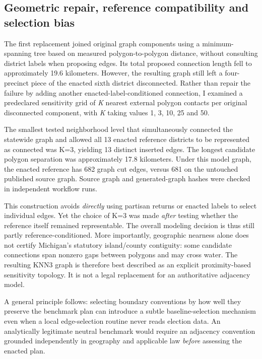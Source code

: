 \documentclass[
  10pt,
]{article}
\begin{document}
\hypertarget{geometric-repair-reference-compatibility-and-selection-bias}{%
\subsection{Geometric repair, reference compatibility and selection
bias}\label{geometric-repair-reference-compatibility-and-selection-bias}}

The first replacement joined original graph components using a
minimum-spanning tree based on measured polygon-to-polygon distance,
without consulting district labels when proposing edges. Its total
proposed connection length fell to approximately 19.6 kilometers.
However, the resulting graph still left a four-precinct piece of the
enacted sixth district disconnected. Rather than repair the failure by
adding another enacted-label-conditioned connection, I examined a
predeclared sensitivity grid of \emph{K} nearest external polygon
contacts per original disconnected component, with \emph{K} taking
values 1, 3, 10, 25 and 50.

The smallest tested neighborhood level that simultaneously connected the
statewide graph and allowed all 13 enacted reference districts to be
represented as connected was K=3, yielding 13 distinct inserted edges.
The longest candidate polygon separation was approximately 17.8
kilometers. Under this model graph, the enacted reference has 682 graph
cut edges, versus 681 on the untouched published source graph. Source
graph and generated-graph hashes were checked in independent workflow
runs.

This construction avoids \emph{directly} using partisan returns or
enacted labels to select individual edges. Yet the choice of K=3 was
made \emph{after} testing whether the reference itself remained
representable. The overall modeling decision is thus still partly
reference-conditioned. More importantly, geographic nearness alone does
not certify Michigan's statutory island/county contiguity: some
candidate connections span nonzero gaps between polygons and may cross
water. The resulting KNN3 graph is therefore best described as an
explicit proximity-based sensitivity topology. It is not a legal
replacement for an authoritative adjacency model.

A general principle follows: selecting boundary conventions by how well
they preserve the benchmark plan can introduce a subtle
baseline-selection mechanism even when a local edge-selection routine
never reads election data. An analytically legitimate neutral benchmark
would require an adjacency convention grounded independently in
geography and applicable law \emph{before} assessing the enacted plan.
\end{document}
